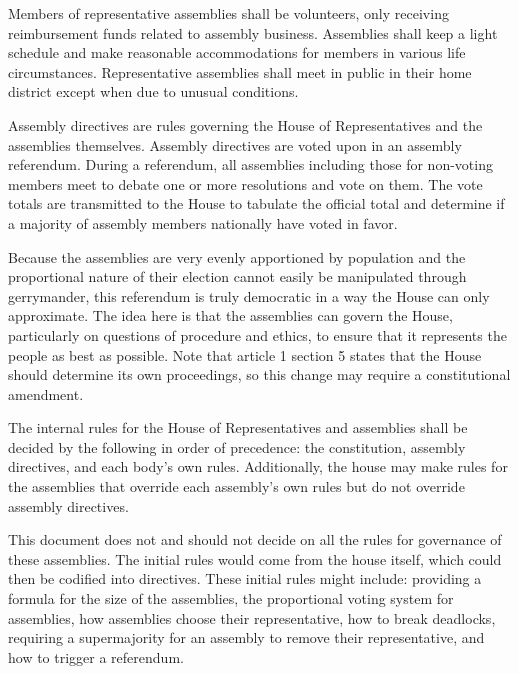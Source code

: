 \documentclass{article}
\begin{document}
\begin{quoting}
Members of representative assemblies shall be volunteers, only receiving reimbursement funds related to assembly business. Assemblies shall keep a light schedule and make reasonable accommodations for members in various life circumstances. Representative assemblies shall meet in public in their home district except when due to unusual conditions.

Assembly directives are rules governing the House of Representatives and the assemblies themselves. Assembly directives are voted upon in an assembly referendum. During a referendum, all assemblies including those for non-voting members meet to debate one or more resolutions and vote on them. The vote totals are transmitted to the House to tabulate the official total and determine if a majority of assembly members nationally have voted in favor.
\end{quoting}

Because the assemblies are very evenly apportioned by population and the proportional nature of their election cannot easily be manipulated through gerrymander, this referendum is truly democratic in a way the House can only approximate. The idea here is that the assemblies can govern the House, particularly on questions of procedure and ethics, to ensure that it represents the people as best as possible. Note that article 1 section 5 states that the House should determine its own proceedings, so this change may require a constitutional amendment.

\begin{quoting}
The internal rules for the House of Representatives and assemblies shall be decided by the following in order of precedence: the constitution, assembly directives, and each body’s own rules. Additionally, the house may make rules for the assemblies that override each assembly’s own rules but do not override assembly directives.
\end{quoting}

This document does not and should not decide on all the rules for governance of these assemblies. The initial rules would come from the house itself, which could then be codified into directives. These initial rules might include: providing a formula for the size of the assemblies, the proportional voting system for assemblies, how assemblies choose their representative, how to break deadlocks, requiring a supermajority for an assembly to remove their representative, and how to trigger a referendum.
\end{document}
